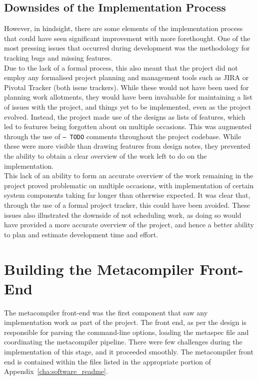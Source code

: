 
\subsection{Downsides of the Implementation Process} %
\label{sub:downsides_of_the_implementation_process}
However, in hindsight, there are some elements of the implementation process that could have seen significant improvement with more forethought. 
One of the most pressing issues that occurred during development was the methodology for tracking bugs and missing features. \\

Due to the lack of a formal process, this also meant that the project did not employ any formalised project planning and management tools such as JIRA or Pivotal Tracker (both issue trackers).
While these would not have been used for planning work allotments, they would have been invaluable for maintaining a list of issues with the project, and things yet to be implemented, even as the project evolved.
Instead, the project made use of the designs as lists of features, which led to features being forgotten about on multiple occasions.
This was augmented through the use of \texttt{-- TODO} comments throughout the project codebase.
While these were more visible than drawing features from design notes, they prevented the ability to obtain a clear overview of the work left to do on the implementation.\\

This lack of an ability to form an accurate overview of the work remaining in the project proved problematic on multiple occasions, with implementation of certain system components taking far longer than otherwise expected.
It was clear that, through the use of a formal project tracker, this could have been avoided.
These issues also illustrated the downside of not scheduling work, as doing so would have provided a more accurate overview of the project, and hence a better ability to plan and estimate development time and effort. 



\section{Building the Metacompiler Front-End} %
\label{sec:building_the_metacompiler_front_end}
The metacompiler front-end was the first component that saw any implementation work as part of the project. 
The front end, as per the design is responsible for parsing the command-line options, loading the metaspec file and coordinating the metacompiler pipeline.
There were few challenges during the implementation of this stage, and it proceeded smoothly.
The metacompiler front end is contained within the files listed in the appropriate portion of Appendix~\ref{cha:software_readme}.\\

